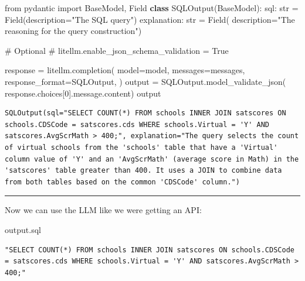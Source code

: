 \documentclass[
  letterpaper,
  DIV=11,
  numbers=noendperiod]{scrartcl}
\newenvironment{Shaded}{\begin{snugshade}}{\end{snugshade}}
\newcommand{\BuiltInTok}[1]{\textcolor[rgb]{0.00,0.23,0.31}{#1}}
\newcommand{\CommentTok}[1]{\textcolor[rgb]{0.37,0.37,0.37}{#1}}
\newcommand{\DecValTok}[1]{\textcolor[rgb]{0.68,0.00,0.00}{#1}}
\newcommand{\ImportTok}[1]{\textcolor[rgb]{0.00,0.46,0.62}{#1}}
\newcommand{\KeywordTok}[1]{\textcolor[rgb]{0.00,0.23,0.31}{\textbf{#1}}}
\newcommand{\NormalTok}[1]{\textcolor[rgb]{0.00,0.23,0.31}{#1}}
\newcommand{\OperatorTok}[1]{\textcolor[rgb]{0.37,0.37,0.37}{#1}}
\newcommand{\StringTok}[1]{\textcolor[rgb]{0.13,0.47,0.30}{#1}}
\begin{document}
\begin{Shaded}
\begin{Highlighting}[numbers=left,,]
\ImportTok{from}\NormalTok{ pydantic }\ImportTok{import}\NormalTok{ BaseModel, Field}
\KeywordTok{class}\NormalTok{ SQLOutput(BaseModel):}
\NormalTok{    sql: }\BuiltInTok{str} \OperatorTok{=}\NormalTok{ Field(description}\OperatorTok{=}\StringTok{"The SQL query"}\NormalTok{)}
\NormalTok{    explanation: }\BuiltInTok{str} \OperatorTok{=}\NormalTok{ Field(}
\NormalTok{      description}\OperatorTok{=}\StringTok{"The reasoning for the query construction"}\NormalTok{)}

\CommentTok{\# Optional }
\CommentTok{\# litellm.enable\_json\_schema\_validation = True}

\NormalTok{response }\OperatorTok{=}\NormalTok{ litellm.completion(}
\NormalTok{  model}\OperatorTok{=}\NormalTok{model,}
\NormalTok{  messages}\OperatorTok{=}\NormalTok{messages,}
\NormalTok{  response\_format}\OperatorTok{=}\NormalTok{SQLOutput,}
\NormalTok{)}
\NormalTok{output }\OperatorTok{=}\NormalTok{ SQLOutput.model\_validate\_json(}
\NormalTok{  response.choices[}\DecValTok{0}\NormalTok{].message.content)}
\NormalTok{output}
\end{Highlighting}
\end{Shaded}

\begin{verbatim}
SQLOutput(sql="SELECT COUNT(*) FROM schools INNER JOIN satscores ON schools.CDSCode = satscores.cds WHERE schools.Virtual = 'Y' AND satscores.AvgScrMath > 400;", explanation="The query selects the count of virtual schools from the 'schools' table that have a 'Virtual' column value of 'Y' and an 'AvgScrMath' (average score in Math) in the 'satscores' table greater than 400. It uses a JOIN to combine data from both tables based on the common 'CDSCode' column.")
\end{verbatim}

\begin{center}\rule{0.5\linewidth}{0.5pt}\end{center}

Now we can use the LLM like we were getting an API:

\begin{Shaded}
\begin{Highlighting}[]
\NormalTok{output.sql}
\end{Highlighting}
\end{Shaded}

\begin{verbatim}
"SELECT COUNT(*) FROM schools INNER JOIN satscores ON schools.CDSCode = satscores.cds WHERE schools.Virtual = 'Y' AND satscores.AvgScrMath > 400;"
\end{verbatim}
\end{document}

